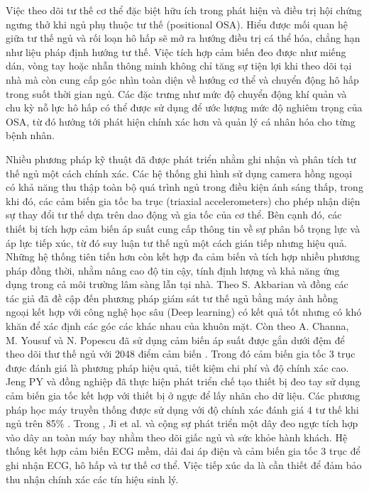 Việc theo dõi tư thế cơ thể đặc biệt hữu ích trong phát hiện 
và điều trị hội chứng ngưng thở khi ngủ phụ thuộc tư thế (positional OSA).
Hiểu được mối quan hệ giữa tư thế ngủ và rối loạn hô hấp sẽ mở ra hướng điều trị cá thể hóa, 
chẳng hạn như liệu pháp định hướng tư thế. 
Việc tích hợp cảm biến đeo được như miếng dán, vòng tay hoặc 
nhẫn thông minh không chỉ tăng sự tiện lợi khi theo dõi tại nhà mà còn cung cấp góc 
nhìn toàn diện về hướng cơ thể và chuyển động hô hấp trong suốt thời gian ngủ. 
Các đặc trưng như mức độ chuyển động khí quản và chu kỳ nỗ lực hô hấp 
có thể được sử dụng để ước lượng mức độ nghiêm trọng của OSA, 
từ đó hướng tới phát hiện chính xác hơn và quản lý cá nhân hóa cho từng bệnh nhân.

Nhiều phương pháp kỹ thuật đã được phát triển nhằm ghi nhận và phân tích tư thế 
ngủ một cách chính xác. Các hệ thống ghi hình sử dụng camera hồng ngoại có khả năng 
thu thập toàn bộ quá trình ngủ trong điều kiện ánh sáng thấp, 
trong khi đó, các cảm biến gia tốc ba trục (triaxial accelerometers) 
cho phép nhận diện sự thay đổi tư thế dựa trên dao động và gia tốc của cơ thể. 
Bên cạnh đó, các thiết bị tích hợp cảm biến áp suất cung cấp thông tin về 
sự phân bố trọng lực và áp lực tiếp xúc, từ đó suy luận tư thế ngủ một cách gián tiếp 
nhưng hiệu quả. Những hệ thống tiên tiến hơn còn kết hợp đa cảm biến và 
tích hợp nhiều phương pháp đồng thời, nhằm nâng cao độ tin cậy, 
tính định lượng và khả năng ứng dụng trong cả môi trường lâm sàng lẫn tại nhà. 
Theo S. Akbarian và đồng các tác giả đã đề cập đến phương pháp giám sát tư 
thế ngủ bằng máy ảnh hồng ngoại kết hợp với công nghệ học sâu (Deep learning) 
\cite{Akbarian_osa} có kết quả tốt nhưng có khó khăn để xác định các góc các khác nhau của khuôn mặt. 
Còn theo A. Channa, M. Yousuf và N. Popescu đã sử dụng cảm biến áp suất được gắn dưới đệm để theo dõi 
thư thế ngủ với 2048 điểm cảm biến \cite{Channa_osa}. 
Trong đó cảm biến gia tốc 3 trục được đánh giá là phương pháp hiệu quả, 
tiết kiệm chi phí và độ chính xác cao. Jeng PY và đồng nghiệp đã thực hiện phát 
triển chế tạo thiết bị đeo tay sử dụng cảm biến gia tốc kết hợp với 
thiết bị ở ngực để lấy nhãn cho dữ liệu. Các phương pháp học máy truyền thống 
được sử dụng với độ chính xác đánh giá 4 tư thế khi ngủ trên 85\% \cite{Jeng_osa}.
Trong \cite{ji2022airline}, Ji et al. và cộng sự phát triển một dây đeo ngực 
tích hợp vào dây an toàn máy bay nhằm theo dõi giấc ngủ và sức khỏe 
hành khách. Hệ thống kết hợp cảm biến ECG mềm, dải đai áp điện và 
cảm biến gia tốc 3 trục để ghi nhận ECG, hô hấp và tư thế cơ thể. 
Việc tiếp xúc da là cần thiết để đảm bảo thu nhận chính xác các tín 
hiệu sinh lý.

